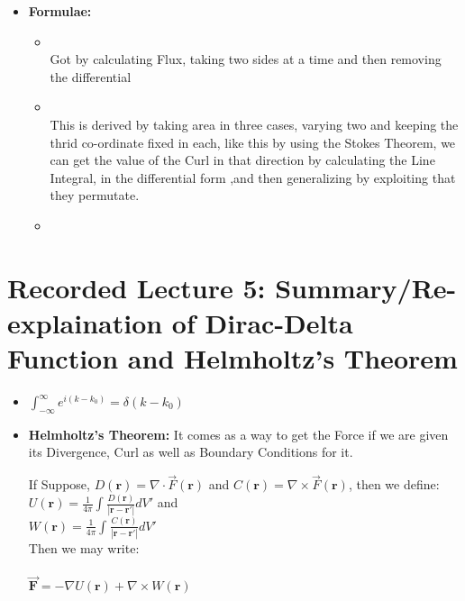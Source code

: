 \documentclass{article}
\begin{document}
\begin{itemize}
  \item \textbf{Formulae:}
  \begin{itemize}
    \item  {}   \\
    Got by calculating Flux, taking two sides at a time and then removing the differential
    \item {} \\
    This is derived by taking area in three cases, varying two and keeping the thrid co-ordinate fixed in each, like this by using the Stokes Theorem, we can get the value of the Curl in that direction by calculating the Line Integral, in the differential form ,and then generalizing by exploiting that they permutate.
    \item
  \end{itemize}
\end{itemize}

\section{Recorded Lecture 5: Summary/Re-explaination of Dirac-Delta Function and Helmholtz's Theorem}

\begin{itemize}
  \item $\int_{- \infty}^{\infty}{e^{i(k-k_0)}} = \delta (k-k_0)$
  \item \textbf{Helmholtz's Theorem:} It comes as a way to get the Force if we are given its Divergence, Curl as well as Boundary Conditions for it.  \\[0.125in]
  \begin{center}
    If Suppose, $D(\mathbf{r}) = \nabla \cdot \vec{F}(\mathbf{r})$ and $C(\mathbf{r}) = \nabla \times \vec{F}(\mathbf{r})$, then we define: \\[0.25in]
        $ U(\mathbf{r}) = \frac{1}{4 \pi} \int_{}^{}{\frac{D(\mathbf{r})}{|\mathbf{r - r'}|}} dV' $ and  \\[0.125in]
        $ W(\mathbf{r}) = \frac{1}{4 \pi} \int_{}^{}{\frac{C(\mathbf{r})}{|\mathbf{r - r'}|}} dV' $  \\[0.125in]
        Then we may write: \\~\\
        $\vec{\mathbf{F}} = -\nabla U(\mathbf{r}) + \nabla \times W(\mathbf{r}) $
  \end{center}
\end{itemize}
\end{document}
